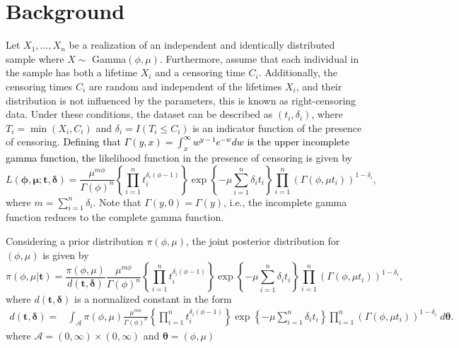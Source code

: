 \documentclass[]{interact}
\theoremstyle{plain}%
\theoremstyle{definition}
\theoremstyle{remark}
\begin{document}
\section{Background}\label{sec:2}

Let $X_1,\ldots,X_n$ be a realization of an independent and identically distributed sample where $X\sim$ Gamma$(\phi,\mu)$. Furthermore, assume that each individual in the sample has both a lifetime $X_i$ and a censoring time $C_i$. Additionally, the censoring times $C_i$ are random and independent of the lifetimes $X_i$, and their distribution is not influenced by the parameters, {\color{black} this is known as right-censoring data}. Under these conditions, the dataset can be described as $(t_i,\delta_i)$, where $T_i=\min(X_i,C_i)$ and $\delta_i=I(T_i\leq C_i)$ is an indicator function of the presence of censoring. \textcolor{black}{Defining that $\Gamma(y,x)  =\int_{x}^{\infty}{w^{y-1}e^{-w}dw}$ is the upper incomplete gamma function, the} likelihood function in the presence of censoring is given by
\begin{equation*}L(\boldsymbol{\phi,\mu; t,\delta})
=\frac{\mu^{m\phi}}{\Gamma(\phi)^n}\left\{\prod_{i=1}^n{t_i^{\delta_i(\phi-1)}}\right\}\exp\left\{-\mu\sum_{i=1}^n {\delta_i}t_i\right\}\prod_{i=1}^n\left(\Gamma(\phi,\mu t_i)\right)^{1-\delta_i},
\end{equation*}
where $m=\sum_{i=1}^{n}\delta_i$. Note that $\Gamma(y,0)=\Gamma(y)$, i.e., the incomplete gamma function reduces to the complete gamma function.

Considering a prior distribution $\pi(\phi,\mu)$, the joint posterior distribution for $(\phi,\mu)$ is given by 
\begin{equation}\label{principal}
\pi(\phi,\mu|\boldsymbol{t})=\frac{\pi(\phi,\mu)}{d(\boldsymbol{t,\delta})} \frac{\mu^{m\phi}}{\Gamma(\phi)^n}\left\{\prod_{i=1}^n{t_i^{\delta_i(\phi-1)}}\right\}\exp\left\{-\mu\sum_{i=1}^n {\delta_i}t_i\right\}\prod_{i=1}^n\left(\Gamma(\phi,\mu t_i)\right)^{1-\delta_i},
\end{equation}
where  $d(\boldsymbol{t,\delta})$ is a normalized constant in the form 
\begin{align*}%
d(\boldsymbol{t,\delta})=&\int_{\mathcal{A}} \pi(\phi,\mu)\frac{\mu^{m\phi}}{\Gamma(\phi)^n}\left\{\prod_{i=1}^n{t_i^{\delta_i(\phi-1)}}\right\}\exp\left\{-\mu\sum_{i=1}^n {\delta_i}t_i\right\}\prod_{i=1}^n\left(\Gamma(\phi,\mu t_i)\right)^{1-\delta_i}\; d\boldsymbol{\theta}.
\end{align*}
where $\mathcal{A}=(0,\infty)\times (0,\infty)$ and $\boldsymbol{\theta}=(\phi,\mu)$
\end{document}
